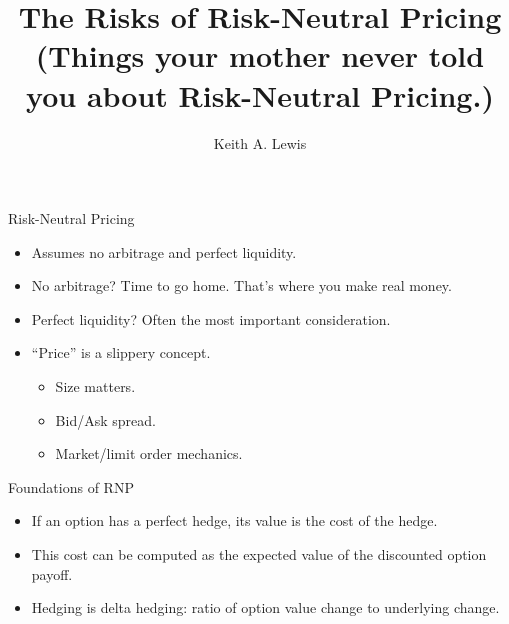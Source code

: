 \documentclass[pdf,colorBG,slideColor,blends]{prosper}
\title{The Risks of Risk-Neutral Pricing\\
{\small (Things your mother never told you about Risk-Neutral Pricing.)}}
\author{Keith A. Lewis}
\begin{document}
\maketitle

\begin{slide}{Risk-Neutral Pricing}

\begin{itemize}

\item Assumes no arbitrage and perfect liquidity.

\item No arbitrage? Time to go home. That's where you make real money.

\item Perfect liquidity? Often the most important consideration.

\item ``Price'' is a slippery concept.
\begin{itemize}
	\item Size matters.
	\item Bid/Ask spread.
	\item Market/limit order mechanics.
\end{itemize}

\end{itemize}

\end{slide}

\begin{slide}{Foundations of RNP}

\begin{itemize}

\item If an option has a perfect hedge, its value is the
cost of the hedge.

\item This cost can be computed as the expected value of
the discounted option payoff.

\item Hedging is delta hedging:  ratio of option value change to
underlying change.

\end{itemize}

\end{slide}
\end{document}
